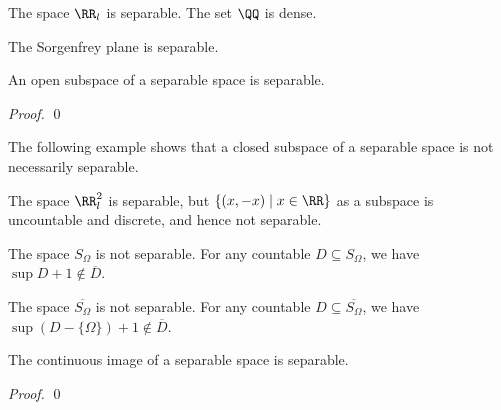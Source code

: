 \begin{example}
    The space $\RR_l$ is separable. The set $\QQ$ is dense.
\end{example}

\begin{corollary}
    The Sorgenfrey plane is separable.
\end{corollary}

\begin{proposition}
    An open subspace of a separable space is separable.
\end{proposition}

\begin{proof}
    \pf
    \qed
\end{proof}

The following example shows that a closed subspace of a separable space is not
necessarily separable.

\begin{example}
    The space $\RR_l^2$ is separable, but $\{ (x, -x) \mid x \in \RR \}$ as a
    subspace is uncountable and discrete, and hence not separable.
\end{example}

\begin{example}
    The space $S_\Omega$ is not separable. For any countable $D \subseteq S_\Omega$,
    we have $\sup D + 1 \notin \overline{D}$.
\end{example}

\begin{example}    
    The space $\overline{S_\Omega}$ is not separable. For any countable $D
    \subseteq \overline{S_\Omega}$, we have $\sup (D - \{ \Omega \}) + 1 \notin
    \overline{D}$.
\end{example}

\begin{proposition}
    The continuous image of a separable space is separable.
\end{proposition}

\begin{proof}
    \pf
    \qed
\end{proof}

